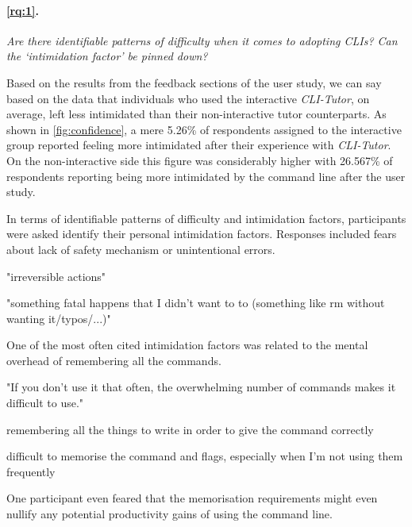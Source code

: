 \paragraph{\ref{rq:1}.} \textit{Are there identifiable patterns of difficulty when it comes to
	adopting CLIs? Can the `intimidation factor' be pinned down?}

Based on the results from the feedback sections of the user study, we can say
based on the data that individuals who used the interactive \textit{CLI-Tutor},
on average, left less intimidated than their non-interactive tutor
counterparts. As shown in \autoref{fig:confidence}, a mere 5.26\% of
respondents assigned to the interactive group reported feeling more intimidated
after their experience with \textit{CLI-Tutor}. On the non-interactive side
this figure was considerably higher with 26.567\% of respondents reporting
being more intimidated by the command line after the user study.

In terms of identifiable patterns of difficulty and intimidation factors,
participants were asked identify their personal intimidation factors. Responses
included fears about lack of safety mechanism or unintentional errors.

\begin{quotes}
	"irreversible actions"
\end{quotes}

\begin{quotes}
	"something fatal happens that I didn't want to to (something like rm without wanting it/typos/...)"
\end{quotes}

One of the most often cited intimidation factors was related to the mental overhead of remembering all the commands.
\begin{quotes}
	"If you don't use it that often, the overwhelming number of commands makes it difficult to use."
\end{quotes}

\begin{quotes}
	remembering all the things to write in order to give the command correctly
\end{quotes}

\begin{quotes}
	difficult to memorise the command and flags, especially when I'm not using them frequently
\end{quotes}

One participant even feared that the memorisation requirements might even
nullify any potential productivity gains of using the command line.

